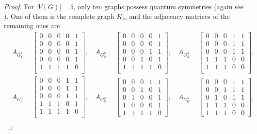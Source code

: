 \documentclass[11pt,reqno]{amsart}
\begin{document}
\begin{proof}
For $|V(G)|=5$, only ten graphs possess quantum symmetries (again see \cite{Weber22}). One of them is the complete graph $K_5$, and the adjacency matrices of the remaining ones are
\begin{align*}
&A_{\scriptscriptstyle G_1^5}=\begin{bmatrix}
0&0&0&0&1\\
0&0&0&0&1\\
0&0&0&0&1\\
0&0&0&0&1\\
1&1&1&1&0\\
\end{bmatrix},\quad
A_{\scriptscriptstyle G_2^5}=\begin{bmatrix}
0&0&0&0&1\\
0&0&0&0&1\\
0&0&0&1&1\\
0&0&1&0&1\\
1&1&1&1&0\\
\end{bmatrix},\quad
A_{\scriptscriptstyle G_3^5}=\begin{bmatrix}
0&0&0&1&1\\
0&0&0&1&1\\
0&0&0&1&1\\
1&1&1&0&0\\
1&1&1&0&0\\
\end{bmatrix},\\
&A_{\scriptscriptstyle G_4^5}=\begin{bmatrix}
0&0&0&1&1\\
0&0&0&1&1\\
0&0&0&1&1\\
1&1&1&0&1\\
1&1&1&1&0\\
\end{bmatrix},\quad
A_{\scriptscriptstyle G_5^5}=\begin{bmatrix}
0&0&0&1&1\\
0&0&1&0&1\\
0&1&0&0&1\\
1&0&0&0&1\\
1&1&1&1&0
\end{bmatrix},\quad
A_{\scriptscriptstyle G_6^5}=\begin{bmatrix}
0&0&0&1&1\\
0&0&1&1&1\\
0&1&0&1&1\\
1&1&1&0&0\\
1&1&1&0&0
\end{bmatrix},\\

\end{align*}
\end{proof}
\end{document}
